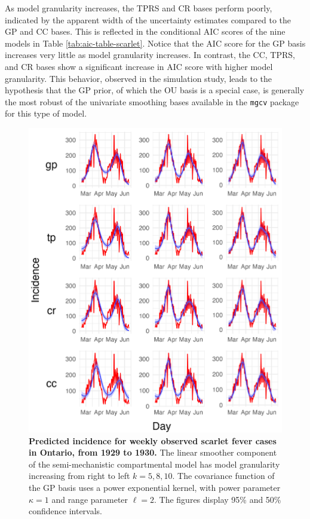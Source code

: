 \documentclass[
11pt, %
oneside, %
english, %
singlespacing, %
]{macthesis} %
\begin{document}
As model granularity increases, the TPRS and CR bases perform poorly, indicated by the apparent width of the uncertainty estimates compared to the GP and CC bases. This is reflected in the conditional AIC scores of the nine models in Table \ref{tab:aic-table-scarlet}. Notice that the AIC score for the GP basis increases very little as model granularity increases. In contrast, the CC, TPRS, and CR bases show a significant increase in AIC score with higher model granularity. This behavior, observed in the simulation study, leads to the hypothesis that the GP prior, of which the OU basis is a special case, is generally the most robust of the univariate smoothing bases available in the \texttt{mgcv} package for this type of model.

\begin{figure}[H]
\centering
\includegraphics[width=\textwidth, height = \textwidth]{figure/Scarlet/Scarlet_plot_gp(-2,2,1)_k(5,8,10)_gamma(014)_I0(100)_plot_incidence.png}
\caption[Predicted Scarlet Fever Incidence (1929-1930)]{\textbf{Predicted incidence for weekly observed scarlet fever cases in Ontario, from 1929 to 1930.} The linear smoother component of the semi-mechanistic compartmental model has model granularity increasing from right to left \(k= 5,8,10\).
The covariance function of the GP basis uses a power exponential kernel, with power parameter \(\kappa = 1\) and range parameter \(\ell = 2\).
The figures display 95\% and 50\% confidence intervals.}
\label{fig:scarlet_inc}
\end{figure}
\end{document}
